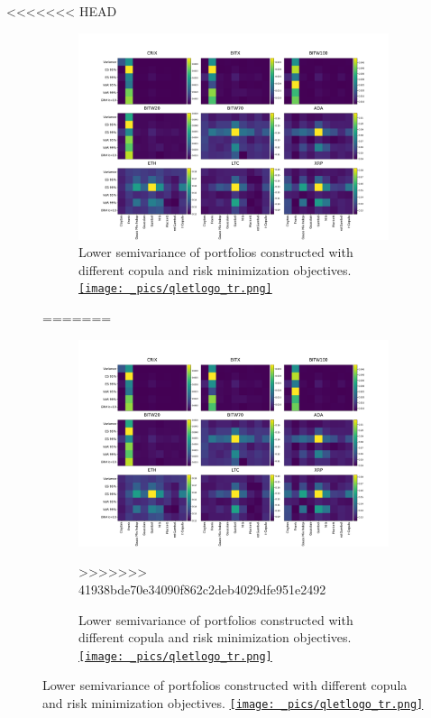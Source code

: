 <<<<<<< HEAD
\begin{figure}[!]
\begin{subfigure}{\textwidth}\centering
        \centering
        \includegraphics[width=\textwidth]{_pics/semiLowerVariance_other.pdf}
      \caption{Lower semivariance of portfolios constructed with different copula and risk minimization objectives.
      \href{http://www.quantlet.com/}{\texttt{[image: \_pics/qletlogo\_tr.png]}} }
    \label{fig:SLV_other}
\end{subfigure}
=======
\begin{figure}[th]
    \centering
    \includegraphics[width=\textwidth]{_pics/semiLowerVariance_other.pdf}
  \caption{Lower semivariance of portfolios constructed with different copula and risk minimization objectives.
  \href{http://www.quantlet.com/}{\texttt{[image: \_pics/qletlogo\_tr.png]}}
  }
\label{fig:SLV_other}
>>>>>>> 41938bde70e34090f862c2deb4029dfe951e2492
\end{figure}







\end{figure}
